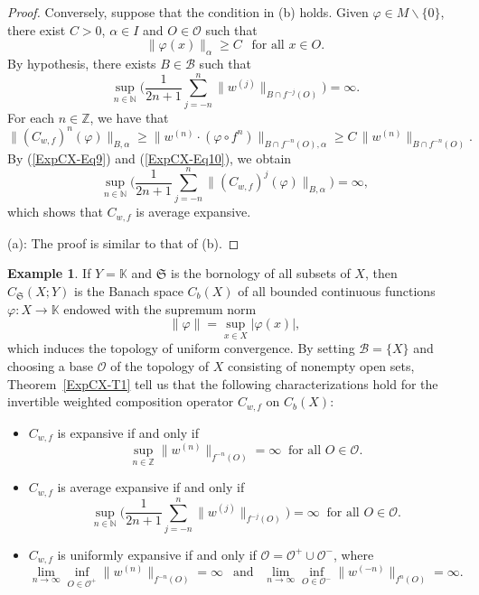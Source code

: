 \documentclass[12pt]{article}
\theoremstyle{plain}
\theoremstyle{definition}
\newtheorem{example}[theorem]{Example}%
\newcommand{\N}{\mathbb{N}} %
\newcommand{\Z}{\mathbb{Z}} %
\newcommand{\K}{\mathbb{K}} %
\newcommand{\cB}{\mathcal{B}}
\newcommand{\cO}{\mathcal{O}}
\newcommand{\fS}{\mathfrak{S}}
\begin{document}
\begin{proof}
Conversely, suppose that the condition in (b) holds.
Given $\varphi \in M \backslash \{0\}$, there exist $C > 0$, $\alpha \in I$ and $O \in \cO$ such that
\[
\|\varphi(x)\|_\alpha \geq C \ \ \text{ for all } x \in O.
\]
By hypothesis, there exists $B \in \cB$ such that
\begin{equation}\label{ExpCX-Eq9}
\sup_{n \in \N} \Big(\frac{1}{2n+1} \sum_{j=-n}^n \|w^{(j)}\|_{B \cap f^{-j}(O)}\Big) = \infty.
\end{equation}
For each $n \in \Z$, we have that
\begin{equation}\label{ExpCX-Eq10}
\|(C_{w,f})^n(\varphi)\|_{B,\alpha} \geq \|w^{(n)} \cdot (\varphi \circ f^n)\|_{B \cap f^{-n}(O),\alpha} 
  \geq C\, \|w^{(n)}\|_{B \cap f^{-n}(O)}.
\end{equation}
By (\ref{ExpCX-Eq9}) and (\ref{ExpCX-Eq10}), we obtain
\[
\sup_{n \in \N} \Big(\frac{1}{2n+1} \sum_{j=-n}^n \|(C_{w,f})^j(\varphi)\|_{B,\alpha}\Big) = \infty,
\]
which shows that $C_{w,f}$ is average expansive. 

\smallskip\noindent
(a): The proof is similar to that of (b).
\end{proof}

\begin{example}\label{ExpCX-Ex1}
If $Y = \K$ and $\fS$ is the bornology of all subsets of $X$, then $C_\fS(X;Y)$ is the Banach space $C_b(X)$ of all bounded continuous functions $\varphi : X \to \K$ endowed with the supremum norm
\[
\|\varphi\| = \sup_{x \in X} |\varphi(x)|,
\]
which induces the topology of uniform convergence.
By setting $\cB = \{X\}$ and choosing a base $\cO$ of the topology of $X$ consisting of nonempty open sets, 
Theorem~\ref{ExpCX-T1} tell us that the following characterizations hold for the invertible weighted composition operator 
$C_{w,f}$ on $C_b(X)$:
\begin{itemize}
\item [\rm (a)] $C_{w,f}$ is expansive if and only if
    \[
    \sup_{n \in \Z} \|w^{(n)}\|_{f^{-n}(O)} = \infty \ \text{ for all } O \in \cO.
    \]
\item [\rm (b)] $C_{w,f}$ is average expansive if and only if 
    \[
    \sup_{n \in \N} \Big(\frac{1}{2n+1} \sum_{j=-n}^n \|w^{(j)}\|_{f^{-j}(O)}\Big) = \infty \ \text{ for all } O \in \cO.
    \]
\item [\rm (c)] $C_{w,f}$ is uniformly expansive if and only if $\cO = \cO^+ \cup \cO^-$, where
\[
\lim_{n \to \infty} \inf_{O \in \cO^+} \|w^{(n)}\|_{f^{-n}(O)} = \infty \ \ \text{ and } \ \ 
\lim_{n \to \infty} \inf_{O \in \cO^-} \|w^{(-n)}\|_{f^{n}(O)} = \infty.
\]
\end{itemize}
\end{example}
\end{document}
